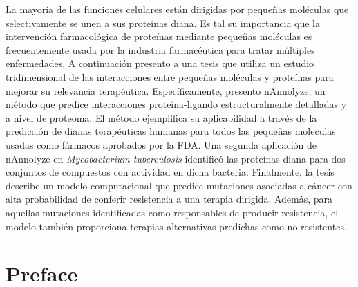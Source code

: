 \documentclass[11pt, b5paper,twoside]{tesi_upf}
\begin{document}
La mayoría de las funciones celulares están dirigidas por pequeñas moléculas que selectivamente se unen a sus proteínas diana. Es tal su importancia que la intervención farmacológica de proteínas mediante pequeñas moléculas es frecuentemente usada por la industria farmacéutica para tratar múltiples enfermedades. A continuación presento a una tesis que utiliza un estudio tridimensional de las interacciones entre pequeñas moléculas y proteínas para mejorar su relevancia terapéutica. Específicamente, presento nAnnolyze, un método que predice interacciones proteína-ligando estructuralmente detalladas y a nivel de proteoma. El método ejemplifica su aplicabilidad a través de la predicción de dianas terapéuticas humanas para todos las pequeñas moleculas usadas como fármacos aprobados por la FDA. Una segunda aplicación de nAnnolyze en \textit{Mycobacterium tuberculosis} identificó las proteínas diana para dos conjuntos de compuestos con actividad en dicha bacteria. Finalmente, la tesis describe un modelo computacional que predice mutaciones asociadas a cáncer con alta probabilidad de conferir resistencia a una terapia dirigida. Además, para aquellas mutaciones identificadas como responsables de producir resistencia, el modelo también proporciona terapias alternativas predichas como no resistentes. 





\vspace*{\fill}

\clearpage
\section*{Preface}

\end{document}
